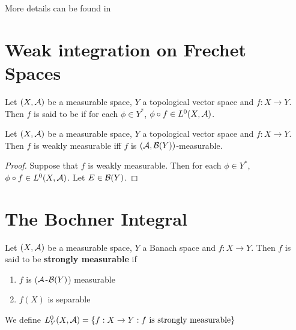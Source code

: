 \documentclass{book}
\begin{document}
More details can be found in ~\cite{vakhania2012probability}



















\newpage
\section{Weak integration on Frechet Spaces}

\begin{defn}
	Let $(X, \mathcal{A})$ be a measurable space, $Y$ a topological vector space and $f:X \rightarrow Y$. Then $f$ is said to be  if for each $\phi \in Y^*$, $\phi \circ f \in L^0(X, \mathcal{A})$. 
\end{defn}

\begin{ex}
	Let $(X, \mathcal{A})$ be a measurable space, $Y$ a topological vector space and $f:X \rightarrow Y$. Then $f$ is weakly measurable iff $f$ is $(\mathcal{A}, \mathcal{B}(Y))$-measurable.
\end{ex}

\begin{proof}
	Suppose that $f$ is weakly measurable. Then for each $\phi \in Y^*$, $\phi \circ f \in L^0(X, \mathcal{A})$. Let $E \in \mathcal{B}(Y)$. 
\end{proof}
	
	
	
	
	
	
	
	
	
	
	
	
	
	
	
	
	
	
	
	
	
	
	
	
	
	\newpage
	\section{The Bochner Integral}
	
	\begin{defn}
		Let $(X, \mathcal{A})$ be a measurable space, $Y$ a Banach space and $f:X \rightarrow Y$. Then $f$ is said to be \textbf{strongly measurable} if 
		\begin{enumerate}
			\item $f$ is ($\mathcal{A}$-$\mathcal{B}(Y)$) measurable
			\item $f(X)$ is separable
		\end{enumerate}
		We define $L^0_Y(X, \mathcal{A}) = \{f:X \rightarrow Y: f \text{ is strongly measurable}\}$
	\end{defn}
\end{document}
